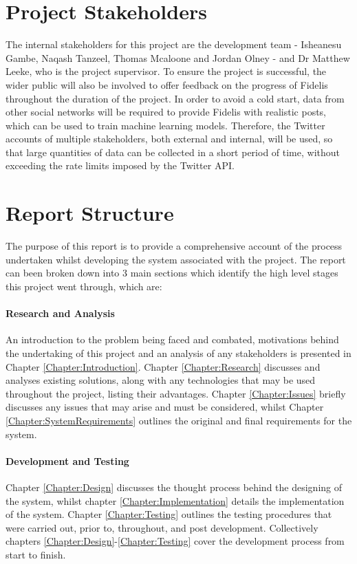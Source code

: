 \section{Project Stakeholders}
The internal stakeholders for this project are the development team - Isheanesu Gambe, Naqash Tanzeel, Thomas Mcaloone and Jordan Olney - and Dr Matthew Leeke, who is the project supervisor. To ensure the project is successful, the wider public will also be involved to offer feedback on the progress of Fidelis throughout the duration of the project. In order to avoid a cold start, data from other social networks will be required to provide Fidelis with realistic posts, which can be used to train machine learning models. Therefore, the Twitter accounts of multiple stakeholders, both external and internal, will be used, so that large quantities of data can be collected in a short period of time, without exceeding the rate limits imposed by the Twitter API.

\section{Report Structure}
The purpose of this report is to provide a comprehensive account of the process undertaken whilst developing the system associated with the project. The report can been broken down into 3 main sections which identify the high level stages this project went through, which are:

\paragraph{Research and Analysis}
An introduction to the problem being faced and combated, motivations behind the undertaking of this project and an analysis of any stakeholders is presented in Chapter \ref{Chapter:Introduction}. Chapter \ref{Chapter:Research} discusses and analyses existing solutions, along with any technologies that may be used throughout the project, listing their advantages. Chapter \ref{Chapter:Issues} briefly discusses any issues that may arise and must be considered, whilst Chapter \ref{Chapter:SystemRequirements} outlines the original and final requirements for the system.

\paragraph{Development and Testing}
Chapter \ref{Chapter:Design} discusses the thought process behind the designing of the system, whilst chapter \ref{Chapter:Implementation} details the implementation of the system. Chapter \ref{Chapter:Testing} outlines the testing procedures that were carried out, prior to, throughout, and post development. Collectively chapters \ref{Chapter:Design}-\ref{Chapter:Testing} cover the development process from start to finish.

